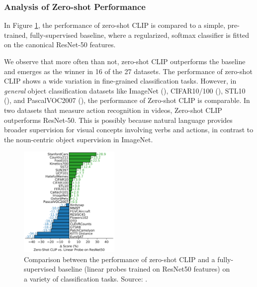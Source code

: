 \documentclass{article}
\begin{document}

\subsubsection{Analysis of Zero-shot Performance}
\label{subsec:clip-zs-analysis}

In Figure \ref{fig:clip_fig5}, the performance of zero-shot CLIP is compared to a simple, pre-trained, fully-supervised baseline, where a regularized, softmax classifier is fitted on the canonical ResNet-50 features.

\medskip
\noindent
We observe that more often than not, zero-shot CLIP outperforms the baseline and emerges as the winner in 16 of the 27 datasets. The performance of zero-shot CLIP shows a wide variation in fine-grained classification tasks. However, in \emph{general} object classification datasets like ImageNet (\citet{deng2009imagenet}), CIFAR10/100 (\citet{krizhevsky2009cifar}), STL10 (\citet{coates2011analysis}), and PascalVOC2007 (\citet{pascal-voc-2007}), the performance of Zero-shot CLIP is comparable. In two datasets that measure action recognition in videos, Zero-shot CLIP outperforms ResNet-50. This is possibly because natural language provides broader supervision for visual concepts involving verbs and actions, in contrast to the noun-centric object supervision in ImageNet.

\begin{figure}
    \centering
    \vspace{-2mm}
    \includegraphics[width=0.43\textwidth]{figures/clip_fig5.png}
    \caption{
        Comparison between the performance of zero-shot CLIP and a fully-supervised baseline (linear probes trained on ResNet50 features) on a variety of classification tasks. Source: \citet{radford2021clip}.
    }
    \label{fig:clip_fig5}
    \vspace{-20mm}
\end{figure}
\end{document}
